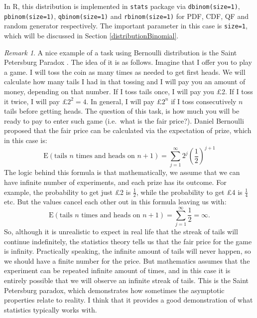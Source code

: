 \documentclass[
]{book}
\theoremstyle{definition}
\theoremstyle{definition}
\theoremstyle{definition}
\theoremstyle{definition}
\theoremstyle{remark}
\newtheorem*{remark}{Remark}
\begin{document}
In R, this distribution is implemented in \texttt{stats} package via \texttt{dbinom(size=1)}, \texttt{pbinom(size=1)}, \texttt{qbinom(size=1)} and \texttt{rbinom(size=1)} for PDF, CDF, QF and random generator respectively. The important parameter in this case is \texttt{size=1}, which will be discussed in Section \ref{distributionBinomial}.

\begin{remark}
A nice example of a task using Bernoulli distribution is the Saint Petersburg Paradox \citep[page 8318]{Kotz2005}. The idea of it is as follows. Imagine that I offer you to play a game. I will toss the coin as many times as needed to get first heads. We will calculate how many tails I had in that tossing and I will pay you an amount of money, depending on that number. If I toss tails once, I will pay you £2. If I toss it twice, I will pay £\(2^2=4\). In general, I will pay £\(2^n\) if I toss consecutively \(n\) tails before getting heads. The question of this task, is how much you will be ready to pay to enter such game (i.e.~what is the fair price?). Daniel Bernoulli proposed that the fair price can be calculated via the expectation of prize, which in this case is:
\begin{equation*}
    \mathrm{E}(\text{tails }n\text{ times and heads on }n+1) = \sum_{j=1}^\infty 2^{j} \left(\frac{1}{2}\right)^{j+1} 
\end{equation*}
The logic behind this formula is that mathematically, we assume that we can have infinite number of experiments, and each prize has its outcome. For example, the probability to get just £2 is \(\frac{1}{2}\), while the probability to get £4 is \(\frac{1}{4}\) etc. But the values cancel each other out in this formula leaving us with:
\begin{equation*}
    \mathrm{E}(\text{tails }n\text{ times and heads on }n+1) = \sum_{j=1}^\infty \frac{1}{2} = \infty .
\end{equation*}
So, although it is unrealistic to expect in real life that the streak of tails will continue indefinitely, the statistics theory tells us that the fair price for the game is infinity. Practically speaking, the infinite amount of tails will never happen, so we should have a finite number for the price. But mathematics assumes that the experiment can be repeated infinite amount of times, and in this case it is entirely possible that we will observe an infinite streak of tails. This is the Saint Petersburg paradox, which demonstrates how sometimes the asymptotic properties relate to reality. I think that it provides a good demonstration of what statistics typically works with.
\end{remark}
\end{document}
